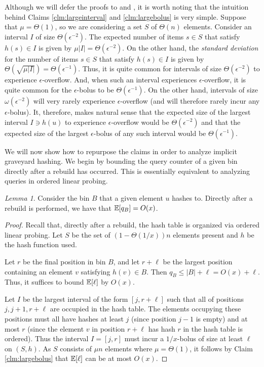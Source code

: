 \documentclass[10pt]{article}
\theoremstyle{remark}
\newtheorem{lemma}[thm]{Lemma}
\theoremstyle{remark}
\begin{document}
Although we will defer the proofs to \cite{us} and \cite{thorup}, it is worth noting that the intuition behind Claims \ref{clm:largeinterval} and \ref{clm:largebolus} is very simple. Suppose that $\mu = \Theta(1)$, so we are considering a set $S$ of $\Theta(n)$ elements. Consider an interval $I$ of size $\Theta(\epsilon^{-2})$. The expected number of items $s \in S$ that satisfy $h(s) \in I$ is given by $\mu |I| = \Theta(\epsilon^{-2})$. On the other hand, the \emph{standard deviation} for the number of items $s \in S$ that satisfy $h(s) \in I$ is given by $\Theta(\sqrt{\mu |I|}) = \Theta(\epsilon^{-1})$. Thus, it is quite common for intervals of size $\Theta(\epsilon^{-2})$ to experience $\epsilon$-overflow. And, when such an interval experiences $\epsilon$-overflow, it is quite common for the $\epsilon$-bolus to be $\Theta(\epsilon^{-1})$. On the other hand, intervals of size $\omega(\epsilon^{-2})$ will very rarely experience $\epsilon$-overflow (and will therefore rarely incur any $\epsilon$-bolus). It, therefore, makes natural sense that the expected size of the largest interval $I \ni h(u)$ to experience $\epsilon$-overflow would be $\Theta(\epsilon^{-2})$ and that the expected size of the largest $\epsilon$-bolus of any such interval would be $\Theta(\epsilon^{-1})$. 

We will now show how to repurpose the claims in order to analyze implicit graveyard hashing. We begin by bounding the query counter of a given bin directly after a rebuild has occurred. This is essentially equivalent to analyzing queries in ordered linear probing.

\begin{lemma}
Consider the bin $B$ that a given element $u$ hashes to. Directly after a rebuild is performed, we have that $\mathbb{E}[q_B] = O(x)$.
\label{lem:counterafterrebuild}
\end{lemma}
\begin{proof}
Recall that, directly after a rebuild, the hash table is organized via ordered linear probing. Let $S$ be the set of $(1 -\Theta(1/x))n$ elements present and $h$ be the hash function used. 

Let $r$ be the final position in bin $B$, and let $r + \ell$ be the largest position containing an element $v$ satisfying $h(v) \in B$. Then $q_B \le |B| + \ell = O(x) + \ell$. Thus, it suffices to bound $\mathbb{E}[\ell]$ by $O(x)$.

Let $I$ be the largest interval of the form $[j, r + \ell]$ such that all of positions $j, j + 1, r + \ell$ are occupied in the hash table. The elements occupying these positions must all have hashes at least $j$ (since position $j - 1$ is empty) and at most $r$ (since the element $v$ in position $r + \ell$ has hash $r$ in the hash table is ordered). Thus the interval $I = [j, r]$ must incur a $1/x$-bolus of size at least $\ell$ on $(S, h)$. As $S$ consists of $\mu n$ elements where $\mu = \Theta(1)$, it follows by Claim \ref{clm:largebolus} that $\mathbb{E}[\ell]$ can be at most $O(x)$. 
\end{proof}
\end{document}
